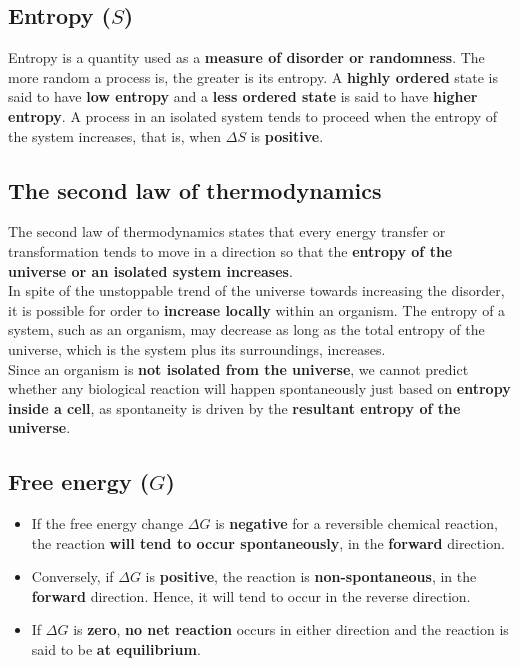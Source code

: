 \documentclass[11pt]{article}
\begin{document}
\subsection{Entropy (\(S\))}
\label{sec:orgb0ad8fe}
Entropy is a quantity used as a \textbf{measure of disorder or randomness}. The more random a process is, the greater is its entropy. A \textbf{highly ordered} state is said to have \textbf{low entropy} and a \textbf{less ordered state} is said to have \textbf{higher entropy}. A process in an isolated system tends to proceed when the entropy of the system increases, that is, when \(\Delta S\) is \textbf{positive}.

\subsection{The second law of thermodynamics}
\label{sec:org0b30ea9}
The second law of thermodynamics states that every energy transfer or transformation tends to move in a direction so that the \textbf{entropy of the universe or an isolated system increases}.
\\[0pt]

In spite of the unstoppable trend of the universe towards increasing the disorder, it is possible for order to \textbf{increase locally} within an organism. The entropy of a system, such as an organism, may decrease as long as the total entropy of the universe, which is the system plus its surroundings, increases.
\\[0pt]

Since an organism is \textbf{not isolated from the universe}, we cannot predict whether any biological reaction will happen spontaneously just based on \textbf{entropy inside a cell}, as spontaneity is driven by the \textbf{resultant entropy of the universe}.

\newpage

\subsection{Free energy (\(G\))}
\label{sec:orgbb95a2c}
\begin{itemize}
\item If the free energy change \(\Delta G\) is \textbf{negative} for a reversible chemical reaction, the reaction \textbf{will tend to occur spontaneously}, in the \textbf{forward} direction.
\item Conversely, if \(\Delta G\) is \textbf{positive}, the reaction is \textbf{non-spontaneous}, in the \textbf{forward} direction. Hence, it will tend to occur in the reverse direction.
\item If \(\Delta G\) is \textbf{zero}, \textbf{no net reaction} occurs in either direction and the reaction is said to be \textbf{at equilibrium}.
\end{itemize}
\end{document}
